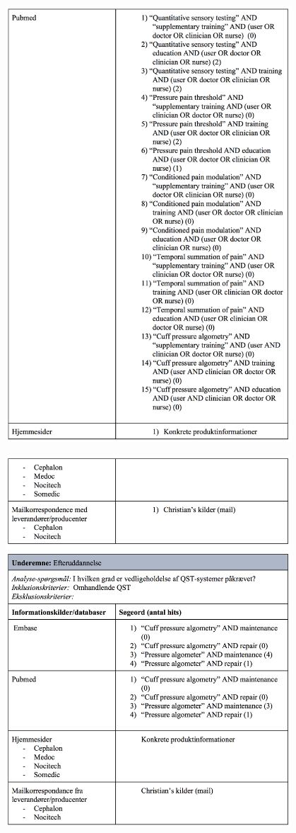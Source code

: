 \begin{center}
\includegraphics[width=0.8\textwidth]{rapportAfsnit/qBilag/sogninger/ORG3}

\includegraphics[width=0.8\textwidth]{rapportAfsnit/qBilag/sogninger/ORG4}
\end{center}

